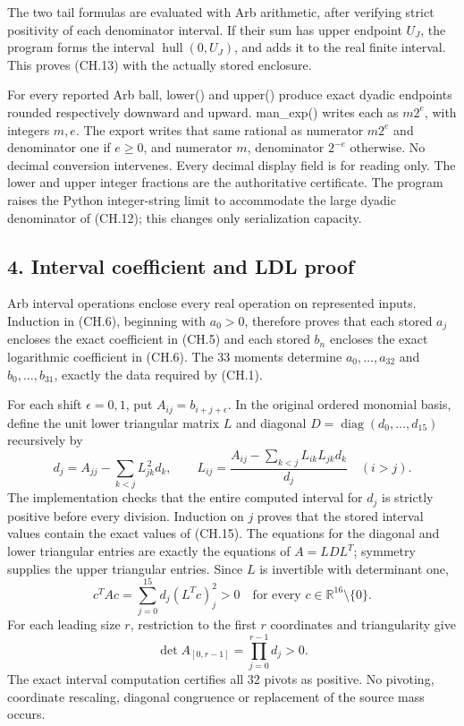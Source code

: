 The two tail formulas are evaluated with Arb arithmetic, after verifying strict positivity of each denominator interval. If their sum has upper endpoint \(U_J\), the program forms the interval \(\operatorname{hull}(0,U_J)\), and adds it to the real finite interval. This proves (CH.13) with the actually stored enclosure.

For every reported Arb ball, lower() and upper() produce exact dyadic endpoints rounded respectively downward and upward. man\_exp() writes each as \(m2^e\), with integers \(m,e\). The export writes that same rational as numerator \(m2^e\) and denominator one if \(e\ge0\), and numerator \(m\), denominator \(2^{-e}\) otherwise. No decimal conversion intervenes. Every decimal display field is for reading only. The lower and upper integer fractions are the authoritative certificate. The program raises the Python integer-string limit to accommodate the large dyadic denominator of (CH.12); this changes only serialization capacity.

\subsection{4. Interval coefficient and LDL proof}\label{C47stage:CH:interval-coefficient-and-ldl-proof}

Arb interval operations enclose every real operation on represented inputs. Induction in (CH.6), beginning with \(a_0>0\), therefore proves that each stored \(a_j\) encloses the exact coefficient in (CH.5) and each stored \(b_n\) encloses the exact logarithmic coefficient in (CH.6). The 33 moments determine \(a_0,\ldots,a_{32}\) and \(b_0,\ldots,b_{31}\), exactly the data required by (CH.1).

For each shift \(\epsilon=0,1\), put \(A_{ij}=b_{i+j+\epsilon}\). In the original ordered monomial basis, define the unit lower triangular matrix \(L\) and diagonal \(D=\operatorname{diag}(d_0,\ldots,d_{15})\) recursively by \[
 d_j=A_{jj}-\sum_{k<j}L_{jk}^{\,2}d_k,\qquad
 L_{ij}=\frac{A_{ij}-\sum_{k<j}L_{ik}L_{jk}d_k}{d_j}\quad(i>j).
\tag{CH.15}
\] The implementation checks that the entire computed interval for \(d_j\) is strictly positive before every division. Induction on \(j\) proves that the stored interval values contain the exact values of (CH.15). The equations for the diagonal and lower triangular entries are exactly the equations of \(A=LDL^T\); symmetry supplies the upper triangular entries. Since \(L\) is invertible with determinant one, \[
 c^TAc=\sum_{j=0}^{15}d_j(L^Tc)_j^2>0
 \quad\text{for every }c\in\mathbb R^{16}\setminus\{0\}.
\tag{CH.16}
\] For each leading size \(r\), restriction to the first \(r\) coordinates and triangularity give \[
 \det A_{[0,r-1]}=\prod_{j=0}^{r-1}d_j>0.
\tag{CH.17}
\] The exact interval computation certifies all 32 pivots as positive. No pivoting, coordinate rescaling, diagonal congruence or replacement of the source mass occurs.


